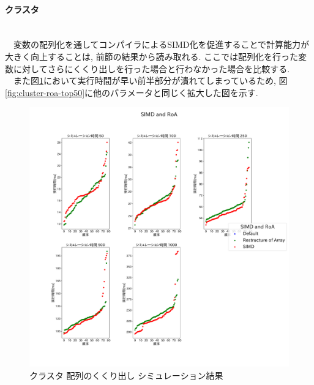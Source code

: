 \paragraph{クラスタ}~\\
　変数の配列化を通してコンパイラによるSIMD化を促進することで計算能力が大きく向上することは,
前節の結果から読み取れる. ここでは配列化を行った変数に対してさらにくくり出しを行った場合と行わなかった場合を比較する.\\
　また図\ref{fig:cluster-roa}において実行時間が早い前半部分が潰れてしまっているため,
図\ref{fig:cluster-roa-top50}に他のパラメータと同じく拡大した図を示す.\\
\begin{figure}[htb]
\begin{center}
    \includegraphics[width=14cm]{./images/cluster-SIMD-and-RoA.pdf}
    \caption{クラスタ 配列のくくり出し シミュレーション結果}
    \label{fig:cluster-roa}
\end{center}
\end{figure}

